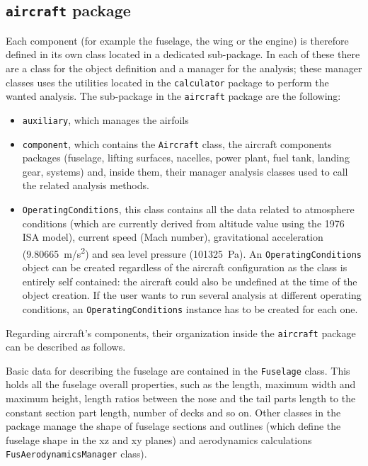 \subsection{\texttt{aircraft} package}
Each component (for example the fuselage, the wing or the engine) is therefore defined in its own class located in a dedicated sub-package. In each of these there are a class for the object definition and a manager for the analysis; these manager classes uses the utilities located in the \lstinline[language=Java]!calculator! package to perform the wanted analysis.
%
The sub-package in the \lstinline[language=Java]!aircraft! package are the following:
%
\begin{itemize}
\item \lstinline[language=Java]!auxiliary!, which manages the airfoils
\item \lstinline[language=Java]!component!, which contains the \lstinline[language=Java]!Aircraft! class, the aircraft components packages (fuselage, lifting surfaces, nacelles, power plant, fuel tank, landing gear, systems) and, inside them, their manager analysis classes used to call the related analysis methods. 
\item \lstinline[language=Java]!OperatingConditions!, this class contains all the data related to atmosphere conditions (which are currently derived from altitude value using the 1976 ISA model), current speed (Mach number), gravitational acceleration (\SI{9.80665 }{\meter/\second^2}) and sea level pressure (\SI{101325}{\Pa}). An \lstinline[language=Java]!OperatingConditions! object can be created regardless of the aircraft configuration as the class is entirely self contained: the aircraft could also be undefined at the time of the object creation. If the user wants to run several analysis at different operating conditions, an \lstinline[language=Java]!OperatingConditions! instance has to be created for each one.
\end{itemize}
%
\noindent
Regarding aircraft's components, their organization inside the \lstinline[language=Java]!aircraft! package can be described as follows. 

\bigskip
\noindent
Basic data for describing the fuselage are contained in the \lstinline[language=Java]!Fuselage! class. This holds all the fuselage overall properties, such as the length, maximum width and maximum height, length ratios between the nose and the tail parts length to the constant section part length, number of decks and so on. Other classes in the package manage the shape of fuselage sections and outlines (which define the fuselage shape in the xz and xy planes) and aerodynamics calculations \lstinline[language=Java]!FusAerodynamicsManager! class).

